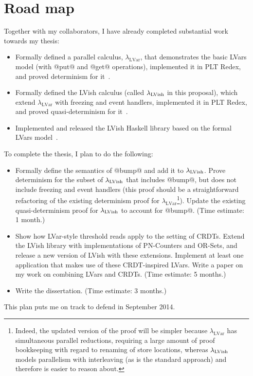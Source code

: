 \documentclass{article}
\begin{document}
\section{Road map}

Together with my collaborators, I have already completed substantial
work towards my thesis:

\begin{itemize}
  \item Formally defined a parallel calculus,
    $\lambda_{\textrm{LVar}}$, that demonstrates the basic LVars model
    (with @put@ and @get@ operations), implemented it in PLT Redex,
    and proved determinism for it~\cite{LVars-paper, LVars-TR}.

  \item Formally defined the LVish calculus (called $\lambda_{\textrm{LVish}}$ in
    this proposal), which extend $\lambda_{\textrm{LVar}}$ with
    freezing and event handlers, implemented it in PLT Redex, and
    proved quasi-determinism for it~\cite{Freeze-paper, Freeze-TR}.

  \item Implemented and released the LVish Haskell library based on
    the formal LVars model~\cite{Freeze-paper}.
\end{itemize}
To complete the thesis, I plan to do the following:
\begin{itemize}
\item Formally define the semantics of @bump@ and add it to
  $\lambda_{\textrm{LVish}}$.  Prove determinism for the subset of $\lambda_{\textrm{LVish}}$
  that includes @bump@, but does not include freezing and event
  handlers (this proof should be a straightforward refactoring of the
  existing determinism proof for
  $\lambda_{\textrm{LVar}}$\footnote{Indeed, the updated version of
    the proof will be simpler because $\lambda_{\textrm{LVar}}$ has
    simultaneous parallel reductions, requiring a large amount of
    proof bookkeeping with regard to renaming of store locations,
    whereas $\lambda_{\textrm{LVish}}$ models parallelism with interleaving (as is
    the standard approach) and therefore is easier to reason about.}).
  Update the existing quasi-determinism proof for $\lambda_{\textrm{LVish}}$ to
  account for @bump@.  (Time estimate: 1 month.)

\item Show how LVar-style threshold reads apply to the setting of
  CRDTs.  Extend the LVish library with implementations of PN-Counters
  and OR-Sets, and release a new version of LVish with these
  extensions. Implement at least one application that makes use of
  these CRDT-inspired LVars.  Write a paper on my work on combining
  LVars and CRDTs.  (Time estimate: 5 months.)

\item Write the dissertation. (Time estimate: 3 months.)
\end{itemize}
This plan puts me on track to defend in September 2014.



\end{document}
